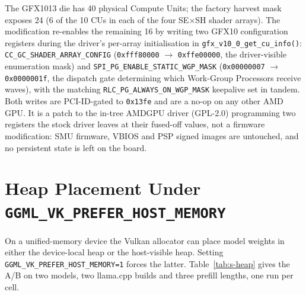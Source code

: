 \documentclass[11pt,a4paper]{article}
\begin{document}
The GFX1013 die has 40 physical Compute Units; the factory harvest
mask exposes 24 (6 of the 10 CUs in each of the four SE$\times$SH
shader arrays).  The modification re-enables the remaining 16 by
writing two GFX10 configuration registers during the driver's
per-array initialisation in \texttt{gfx\_v10\_0\_get\_cu\_info()}:
\texttt{CC\_GC\_SHADER\_ARRAY\_CONFIG} (\texttt{0xfff80000} $\to$
\texttt{0xffe00000}, the driver-visible enumeration mask) and
\texttt{SPI\_PG\_ENABLE\_STATIC\_WGP\_MASK} (\texttt{0x00000007}
$\to$ \texttt{0x0000001f}, the dispatch gate determining which
Work-Group Processors receive waves), with the matching
\texttt{RLC\_PG\_ALWAYS\_ON\_WGP\_MASK} keepalive set in tandem.  Both
writes are PCI-ID-gated to \texttt{0x13fe} and are a no-op on any
other AMD GPU.  It is a patch to the in-tree AMDGPU driver (GPL-2.0)
programming two registers the stock driver leaves at their fused-off
values, not a firmware modification: SMU firmware, VBIOS and PSP
signed images are untouched, and no persistent state is left on the
board.

\section{Heap Placement Under \texttt{GGML\_VK\_PREFER\_HOST\_MEMORY}}\label{sec:s-heap}

On a unified-memory device the Vulkan allocator can place model weights
in either the device-local heap or the host-visible heap.  Setting
\texttt{GGML\_VK\_PREFER\_HOST\_MEMORY=1} forces the latter.
Table~\ref{tab:s-heap} gives the A/B on two models, two llama.cpp builds
and three prefill lengths, one run per cell.
\end{document}
